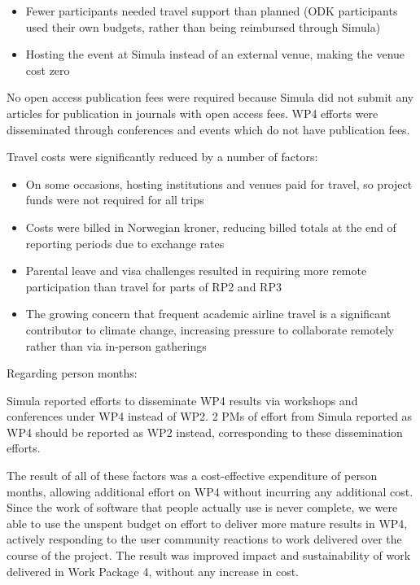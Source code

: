 \begin{itemize}
    \item Fewer participants needed travel support than planned (ODK participants used their own budgets, rather than being reimbursed through Simula)
    \item Hosting the event at Simula instead of an external venue, making the venue cost zero
\end{itemize}

No open access publication fees were required because Simula did not submit any articles for publication in journals with open access fees.
WP4 efforts were disseminated through conferences and events which do not have publication fees.

Travel costs were significantly reduced by a number of factors:

\begin{itemize}
  \item On some occasions, hosting institutions and venues paid for travel, so project funds were not required for all trips
  \item Costs were billed in Norwegian kroner, reducing billed totals at the end of reporting periods due to exchange rates
  \item Parental leave and visa challenges resulted in requiring more remote participation
    than travel for parts of RP2 and RP3
  \item The growing concern that frequent academic airline travel is a significant contributor to climate change,
    increasing pressure to collaborate remotely rather than via in-person gatherings
\end{itemize}

Regarding person months:

Simula reported efforts to disseminate WP4 results via workshops and conferences under WP4 instead of WP2.
2 PMs of effort from Simula reported as WP4 should be reported as WP2 instead,
corresponding to these dissemination efforts.

The result of all of these factors was a cost-effective expenditure of person months,
allowing additional effort on WP4 without incurring any additional cost.
Since the work of software that people actually use is never complete,
we were able to use the unspent budget on effort to deliver more mature results in WP4,
actively responding to the user community reactions to work delivered over the course of the project.
The result was improved impact and sustainability of work delivered in Work Package 4,
without any increase in cost.


